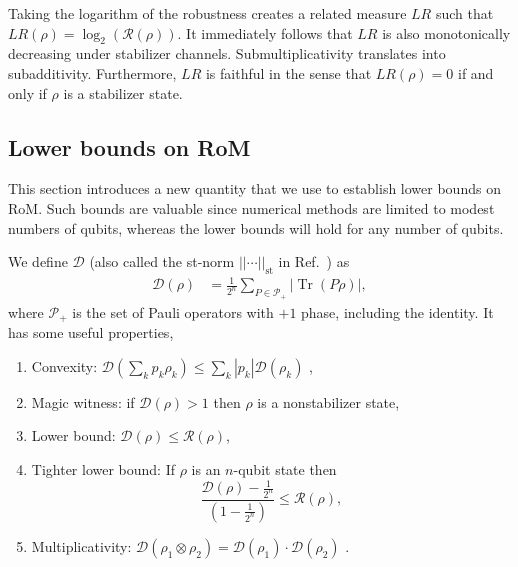 \documentclass[aps,prl,twocolumn,showpacs,superscriptaddress,groupedaddress,amsmath,amssymb]{revtex4-1}  %
\DeclareMathOperator{\Tr}{Tr}
\newcommand{\Pplus}{\ensuremath{\mathcal{P}_{+}}}
\newcommand{\tr}{\ensuremath{\mathrm{\Tr}}}
\begin{document}
Taking the logarithm of the robustness creates a related measure $LR$ such that $LR(\rho)=\log_2 ( \mathcal{R}(\rho))$.  It immediately follows that $LR$ is also monotonically decreasing under stabilizer channels.  Submultiplicativity translates into subadditivity.  Furthermore, $LR$ is faithful in the sense that $LR(\rho)=0$ if and only if $\rho$ is a stabilizer state.

\subsection{Lower bounds on RoM}\label{subsec:Lower bounds on RoM}
\label{sec:lowerbounds}

This section introduces a new quantity that we use to establish lower bounds on RoM. Such bounds are valuable since numerical methods are limited to modest numbers of qubits, whereas the lower bounds will hold for any number of qubits.

We define $\mathcal{D}$ (also called the st-norm $|| \cdots ||_{\mathrm{st}}$ in Ref.~\cite{campbell_catalysis_2011}) as
\begin{align}
  \mathcal{D} (\rho) & = \frac{1}{2^n} \sum_{ P \in \Pplus } | \tr (P \rho) | ,
\end{align}
where $\Pplus$ is the set of Pauli operators with $+1$ phase, including the identity. 
It has some useful properties, 
\begin{enumerate}
	\item[D1\phantom{*}] Convexity: $\mathcal{D}(\sum_k p_k \rho_k ) \leq \sum_k  |p_k| \mathcal{D}(\rho_k ) $ ,
	\item[D2\phantom{*}] Magic witness: if $\mathcal{D}(\rho)>1$  then $\rho$ is a nonstabilizer state,
    \item[D3\phantom{*}]  Lower bound: $\mathcal{D} (\rho) \leq \mathcal{R}(\rho)$, 
    \item[D3*]  Tighter lower bound: If $\rho$ is an $n$-qubit state then \\
\begin{equation}
	\frac{\mathcal{D}(\rho)-\frac{1}{2^n}}{\left(1 -  \frac{1}{2^n} \right)}   \leq \mathcal{R}(\rho) , \label{eqn:tighterLB}
\end{equation}
    \item[D4] Multiplicativity: $\mathcal{D}(\rho_1 \otimes \rho_2) = \mathcal{D}(\rho_1) \cdot \mathcal{D}( \rho_2)$ .
\end{enumerate}
\end{document}
